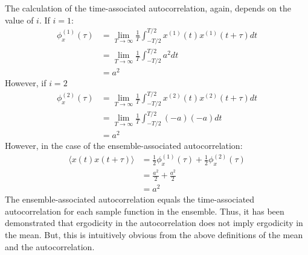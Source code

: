 \begin{homeworkProblem}
The calculation of the time-associated autocorrelation, again, depends on the value of $
i $. If $ i=1 $:
\begin{align*}
   \phi_{x}^{(1)}(\tau) &=
   \lim_{T \to \infty}\frac{1}{T} \int_{-T/2}^{T/2} x^{(1)}(t)x^{(1)}(t+\tau) dt
   \\
   &= \lim_{T \to \infty} \frac{1}{T}\int_{-T/2}^{T/2}a^2 dt \\
   &= a^2
\end{align*}
However, if $ i=2 $
\begin{align*}
   \phi_{x}^{(2)}(\tau) &=
   \lim_{T \to \infty}\frac{1}{T} \int_{-T/2}^{T/2} x^{(2)}(t)x^{(2)}(t+\tau) dt
   \\
   &= \lim_{T \to \infty} \frac{1}{T}\int_{-T/2}^{T/2}(-a)(-a) dt \\
   &= a^2
\end{align*}
However, in the case of the ensemble-associated autocorrelation:
\begin{align*}
   \langle x(t) x(t +\tau) \rangle &= \frac{1}{2}\phi_{x}^{(1)}(\tau) +
   \frac{1}{2} \phi_{x}^{(2)}(\tau) \\
   &= \frac{a^2}{2} + \frac{a^2}{2} \\
   &= a^2
\end{align*}
The ensemble-associated autocorrelation equals the time-associated
autocorrelation for each sample function in the ensemble. Thus, it has been
demonstrated that ergodicity in the autocorrelation does not imply ergodicity in
the mean. But, this is intuitively obvious from the above definitions of the
mean and the autocorrelation.
\end{homeworkProblem}
